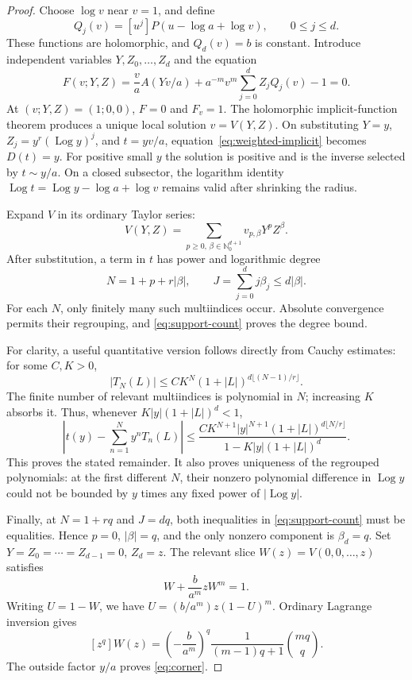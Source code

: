 \documentclass[11pt,a4paper]{article}
\numberwithin{equation}{section}
\theoremstyle{definition}
\theoremstyle{remark}
\DeclareMathOperator{\Log}{Log}
\newcommand{\Nzero}{\mathbb N_0}
\begin{document}
\begin{proof}
Choose \(\log v\) near \(v=1\), and define
\[
 Q_j(v)=[u^j]P(u-\log a+\log v),\qquad 0\le j\le d.
\]
These functions are holomorphic, and \(Q_d(v)=b\) is constant.
Introduce independent variables \(Y,Z_0,\ldots,Z_d\) and the equation
\begin{equation}
 F(v;Y,Z)=
 \frac va A(Yv/a)
 +a^{-m}v^m\sum_{j=0}^dZ_jQ_j(v)-1=0.
 \label{eq:weighted-implicit}
\end{equation}
At \((v;Y,Z)=(1;0,0)\), \(F=0\) and \(F_v=1\).
The holomorphic implicit-function theorem produces a unique local
solution \(v=V(Y,Z)\).
On substituting \(Y=y\), \(Z_j=y^r(\Log y)^j\), and \(t=yv/a\),
equation~\eqref{eq:weighted-implicit} becomes \(D(t)=y\).
For positive small \(y\) the solution is positive and is the inverse
selected by \(t\sim y/a\).  On a closed subsector, the logarithm identity
\(\Log t=\Log y-\log a+\log v\) remains valid after shrinking the radius.

Expand \(V\) in its ordinary Taylor series:
\[
 V(Y,Z)=\sum_{p\ge0,\,\beta\in\Nzero^{d+1}}
 v_{p,\beta}Y^pZ^\beta.
\]
After substitution, a term in \(t\) has power and logarithmic degree
\begin{equation}
 N=1+p+r|\beta|,\qquad
 J=\sum_{j=0}^dj\beta_j\le d|\beta|.
 \label{eq:support-count}
\end{equation}
For each \(N\), only finitely many such multiindices occur.
Absolute convergence permits their regrouping, and
\eqref{eq:support-count} proves the degree bound.

For clarity, a useful quantitative version follows directly from
Cauchy estimates: for some \(C,K>0\),
\[
 |T_N(L)|\le CK^N(1+|L|)^{d\lfloor(N-1)/r\rfloor}.
\]
The finite number of relevant multiindices is polynomial in \(N\);
increasing \(K\) absorbs it.  Thus, whenever
\(K|y|(1+|L|)^d<1\),
\begin{equation}
 \left|t(y)-\sum_{n=1}^{N}y^nT_n(L)\right|
 \le
 \frac{CK^{N+1}|y|^{N+1}(1+|L|)^{d\lfloor N/r\rfloor}}
      {1-K|y|(1+|L|)^d}.
 \label{eq:cauchy-bound}
\end{equation}
This proves the stated remainder.  It also proves uniqueness of the
regrouped polynomials: at the first different \(N\), their nonzero
polynomial difference in \(\Log y\) could not be bounded by \(y\) times
any fixed power of \(|\Log y|\).

Finally, at \(N=1+rq\) and \(J=dq\), both inequalities in
\eqref{eq:support-count} must be equalities.
Hence \(p=0\), \(|\beta|=q\), and the only nonzero component is
\(\beta_d=q\).
Set \(Y=Z_0=\cdots=Z_{d-1}=0\), \(Z_d=z\).  The relevant slice
\(W(z)=V(0,0,\ldots,z)\) satisfies
\[
 W+\frac{b}{a^m}zW^m=1.
\]
Writing \(U=1-W\), we have
\(U=(b/a^m)z(1-U)^m\).
Ordinary Lagrange inversion gives
\[
 [z^q]W(z)=
 \left(-\frac{b}{a^m}\right)^q
 \frac{1}{(m-1)q+1}\binom{mq}{q}.
\]
The outside factor \(y/a\) proves \eqref{eq:corner}.
\end{proof}
\end{document}
